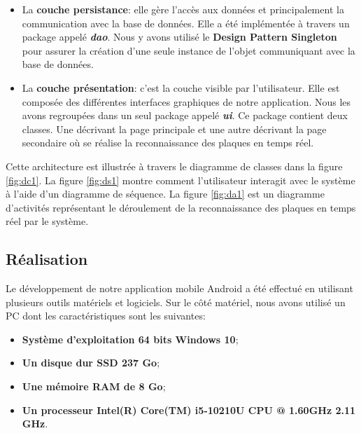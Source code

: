 \begin{itemize}
\begin{itemize}
            \end{itemize}
        
        \item La \textbf{couche persistance}: elle gère l’accès aux données et principalement la communication avec la base de données. Elle a été implémentée à travers un package appelé \textbf{\textit{dao}}. Nous y avons utilisé le \textbf{Design Pattern Singleton} pour assurer la création d'une seule instance de l'objet communiquant avec la base de données. 
        
        \item La \textbf{couche présentation}: c’est la couche visible par l’utilisateur. Elle est composée des différentes interfaces graphiques de notre application. Nous les avons regroupées dans un seul package appelé \textbf{\textit{ui}}. Ce package contient deux classes. Une décrivant la page principale et une autre décrivant la page secondaire où se réalise la reconnaissance des plaques en temps réel. 
    \end{itemize}
    Cette architecture est illustrée à travers le diagramme de classes dans la figure \ref{fig:dc1}. La figure \ref{fig:ds1} montre comment l'utilisateur interagit avec le système à l'aide d'un diagramme de séquence. La figure \ref{fig:da1} est un diagramme d'activités représentant le déroulement de la reconnaissance des plaques en temps réel par le système.
    
    \subsection{Réalisation}
    Le développement de notre application mobile Android a été effectué en utilisant plusieurs outils matériels et logiciels. Sur le côté matériel, nous avons utilisé un PC dont les caractéristiques sont les suivantes:
        \begin{itemize}
            \item \textbf{Système d'exploitation 64 bits Windows 10};
            \item \textbf{Un disque dur SSD 237 Go};
            \item \textbf{Une mémoire RAM de 8 Go};
            \item \textbf{Un processeur Intel(R) Core(TM) i5-10210U CPU @ 1.60GHz   2.11 GHz}.
        \end{itemize}
    
